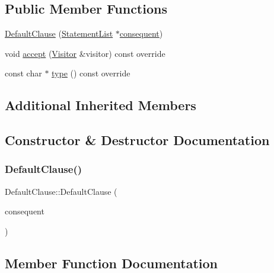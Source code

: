 \subsection*{Public Member Functions}
\begin{DoxyCompactItemize}
\item 
\hyperlink{struct_default_clause_a9f15e6fc45dc6e8a3d87a02aa4798b25}{Default\+Clause} (\hyperlink{struct_statement_list}{Statement\+List} $\ast$\hyperlink{struct_case_clause_a3e6914411610d1893b61172521e11288}{consequent})
\item 
void \hyperlink{struct_default_clause_ade62e79cf9ad891d974528e1e172e2b6}{accept} (\hyperlink{struct_visitor}{Visitor} \&visitor) const override
\item 
const char $\ast$ \hyperlink{struct_default_clause_a464358dcd7e4e13287482d3c858f3538}{type} () const override
\end{DoxyCompactItemize}
\subsection*{Additional Inherited Members}


\subsection{Constructor \& Destructor Documentation}
\mbox{\label{struct_default_clause_a9f15e6fc45dc6e8a3d87a02aa4798b25}} 
\subsubsection{\texorpdfstring{Default\+Clause()}{DefaultClause()}}
{\footnotesize\ttfamily Default\+Clause\+::\+Default\+Clause (\begin{DoxyParamCaption}\item[{\hyperlink{struct_statement_list}{Statement\+List} $\ast$}]{consequent }\end{DoxyParamCaption})\hspace{0.3cm}{\ttfamily [inline]}}



\subsection{Member Function Documentation}
\mbox{\label{struct_default_clause_ade62e79cf9ad891d974528e1e172e2b6}} 

